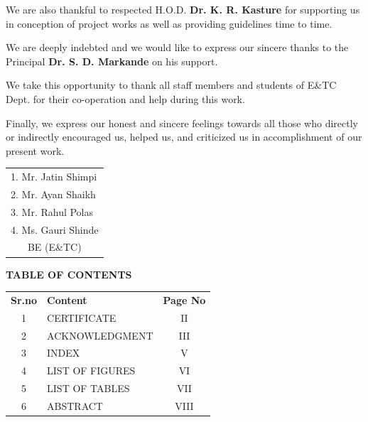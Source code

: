 \documentclass[12pt,a4paper]{report}
\numberwithin{figure}{subsection}
\numberwithin{table}{subsection}
\begin{document}
We are also thankful to respected H.O.D. \textbf{Dr. K. R. Kasture} for supporting us in conception of project works as well as providing guidelines time to time.

We are deeply indebted and we would like to express our sincere thanks to the Principal \textbf{Dr. S. D. Markande} on his support.

We take this opportunity to thank all staff members and students of E\&TC Dept. for their co-operation and help during this work.

Finally, we express our honest and sincere feelings towards all those who directly or indirectly encouraged us, helped us, and criticized us in accomplishment of our present work.

\vspace{2\baselineskip}
\begin{flushright}
\begin{tabular}{@{}l@{}}
1. Mr. Jatin Shimpi\\
2. Mr. Ayan Shaikh\\
3. Mr. Rahul Polas\\
4. Ms. Gauri Shinde\\[0.5\baselineskip]
\multicolumn{1}{c}{BE (E\&TC)}
\end{tabular}
\end{flushright}

\newpage
\begin{center}
{\fontsize{12}{14}\selectfont \textbf{TABLE OF CONTENTS}} \\[1.5\baselineskip]
\begin{tabular}{clc}
\textbf{Sr.no} & \textbf{Content} & \textbf{Page No} \\
1 & CERTIFICATE & II \\
2 & ACKNOWLEDGMENT & III \\
3 & INDEX & V \\
4 & LIST OF FIGURES & VI \\
5 & LIST OF TABLES & VII \\
6 & ABSTRACT & VIII \\
\end{tabular}
\end{center}
\end{document}
